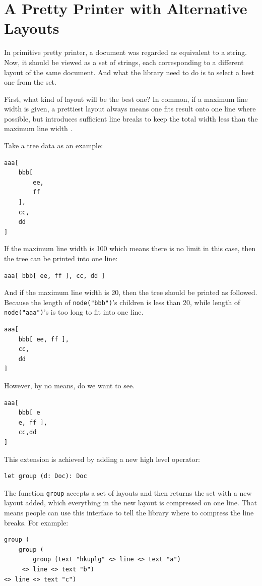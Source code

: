 \section{A Pretty Printer with Alternative Layouts} \label{section:printer}

In primitive pretty printer, a document was regarded as equivalent to a string. Now, it should be viewed as a set of strings, each corresponding to a different layout of the same document. And what the library need to do is to select a best one from the set.

First, what kind of layout will be the best one? In common, if a maximum line width is given, a prettiest layout always means one fits result onto one line where possible, but introduces sufficient line breaks to keep the total width less than the maximum line width \cite{wadler2003prettier}.

Take a tree data as an example:
\begin{lstlisting}
aaa[
    bbb[
        ee,
        ff
    ],
    cc,
    dd
]
\end{lstlisting}

If the maximum line width is 100 which means there is no limit in this case, then the tree can be printed into one line:
\begin{lstlisting}
aaa[ bbb[ ee, ff ], cc, dd ]
\end{lstlisting}

And if the maximum line width is 20, then the tree should be printed as followed. Because the length of \texttt{node("bbb")}'s children is less than 20, while length of \texttt{node("aaa")}'s is too long to fit into one line.
\begin{lstlisting}
aaa[
    bbb[ ee, ff ],
    cc,
    dd
]
\end{lstlisting}

However, by no means, do we want to see.
\begin{lstlisting}
aaa[
    bbb[ e
    e, ff ],
    cc,dd
]
\end{lstlisting}

This extension is achieved by adding a new high level operator:
\begin{lstlisting}
let group (d: Doc): Doc
\end{lstlisting}

The function \texttt{group} accepts a set of layouts and then returns the set with a new layout added, which everything in the new layout is compressed on one line. That means people can use this interface to tell the library where to compress the line breaks.
For example:
\begin{lstlisting}
group (
    group (
        group (text "hkuplg" <> line <> text "a")
     <> line <> text "b")
<> line <> text "c")
\end{lstlisting}

